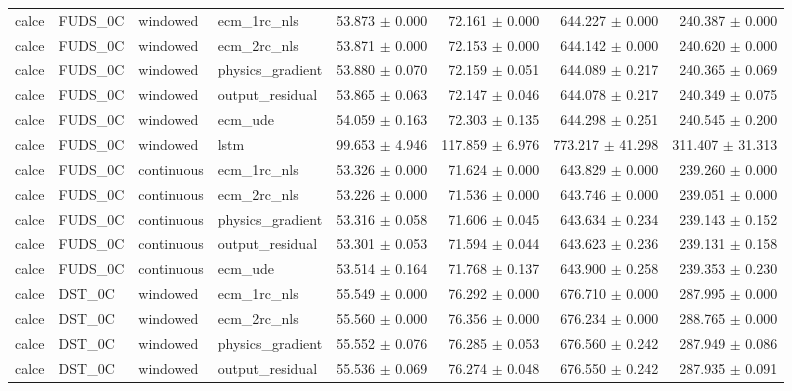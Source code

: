 \begin{longtable}{llllrrrr}
calce & FUDS\_0C & windowed & ecm\_1rc\_nls & 53.873 $\pm$ 0.000 & 72.161 $\pm$ 0.000 & 644.227 $\pm$ 0.000 & 240.387 $\pm$ 0.000 \\
calce & FUDS\_0C & windowed & ecm\_2rc\_nls & 53.871 $\pm$ 0.000 & 72.153 $\pm$ 0.000 & 644.142 $\pm$ 0.000 & 240.620 $\pm$ 0.000 \\
calce & FUDS\_0C & windowed & physics\_gradient & 53.880 $\pm$ 0.070 & 72.159 $\pm$ 0.051 & 644.089 $\pm$ 0.217 & 240.365 $\pm$ 0.069 \\
calce & FUDS\_0C & windowed & output\_residual & 53.865 $\pm$ 0.063 & 72.147 $\pm$ 0.046 & 644.078 $\pm$ 0.217 & 240.349 $\pm$ 0.075 \\
calce & FUDS\_0C & windowed & ecm\_ude & 54.059 $\pm$ 0.163 & 72.303 $\pm$ 0.135 & 644.298 $\pm$ 0.251 & 240.545 $\pm$ 0.200 \\
calce & FUDS\_0C & windowed & lstm & 99.653 $\pm$ 4.946 & 117.859 $\pm$ 6.976 & 773.217 $\pm$ 41.298 & 311.407 $\pm$ 31.313 \\
calce & FUDS\_0C & continuous & ecm\_1rc\_nls & 53.326 $\pm$ 0.000 & 71.624 $\pm$ 0.000 & 643.829 $\pm$ 0.000 & 239.260 $\pm$ 0.000 \\
calce & FUDS\_0C & continuous & ecm\_2rc\_nls & 53.226 $\pm$ 0.000 & 71.536 $\pm$ 0.000 & 643.746 $\pm$ 0.000 & 239.051 $\pm$ 0.000 \\
calce & FUDS\_0C & continuous & physics\_gradient & 53.316 $\pm$ 0.058 & 71.606 $\pm$ 0.045 & 643.634 $\pm$ 0.234 & 239.143 $\pm$ 0.152 \\
calce & FUDS\_0C & continuous & output\_residual & 53.301 $\pm$ 0.053 & 71.594 $\pm$ 0.044 & 643.623 $\pm$ 0.236 & 239.131 $\pm$ 0.158 \\
calce & FUDS\_0C & continuous & ecm\_ude & 53.514 $\pm$ 0.164 & 71.768 $\pm$ 0.137 & 643.900 $\pm$ 0.258 & 239.353 $\pm$ 0.230 \\
calce & DST\_0C & windowed & ecm\_1rc\_nls & 55.549 $\pm$ 0.000 & 76.292 $\pm$ 0.000 & 676.710 $\pm$ 0.000 & 287.995 $\pm$ 0.000 \\
calce & DST\_0C & windowed & ecm\_2rc\_nls & 55.560 $\pm$ 0.000 & 76.356 $\pm$ 0.000 & 676.234 $\pm$ 0.000 & 288.765 $\pm$ 0.000 \\
calce & DST\_0C & windowed & physics\_gradient & 55.552 $\pm$ 0.076 & 76.285 $\pm$ 0.053 & 676.560 $\pm$ 0.242 & 287.949 $\pm$ 0.086 \\
calce & DST\_0C & windowed & output\_residual & 55.536 $\pm$ 0.069 & 76.274 $\pm$ 0.048 & 676.550 $\pm$ 0.242 & 287.935 $\pm$ 0.091 \\

\end{longtable}
